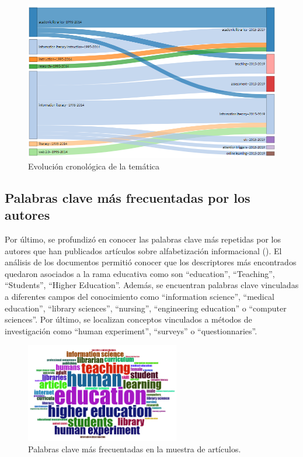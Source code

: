 \documentclass[spanish]{textolivre}
\begin{document}
\begin{figure}[h!]
 \centering
 \includegraphics[width=\textwidth]{fig4.png}
 \caption{Evolución cronológica de la temática}
 \label{fig4}
\end{figure}

\subsection{Palabras clave más frecuentadas por los autores}
Por último, se profundizó en conocer las palabras clave más repetidas por los autores que han publicados artículos sobre alfabetización informacional (). El análisis de los documentos permitió conocer que los descriptores más encontrados quedaron asociados a la rama educativa como son “education”, “Teaching”, “Students”, “Higher Education”. Además, se encuentran palabras clave vinculadas a diferentes campos del conocimiento como “information science”, “medical education”, “library sciences”, “nursing”, “engineering education” o  “computer sciences”. Por último, se localizan conceptos vinculados a métodos de investigación como “human experiment”, “surveys” o “questionnaries”.

\begin{figure}[h!]
 \centering
 \includegraphics[width=0.6\textwidth]{fig5.png}
 \caption{Palabras clave más frecuentadas en la muestra de artículos.}
 \label{fig5}
\end{figure}
\end{document}
